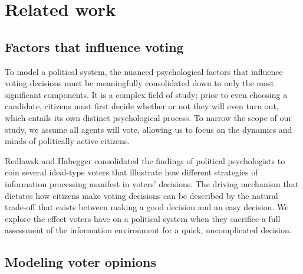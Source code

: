\section{Related work}
\label{sec:related}


%

\subsection{Factors that influence voting}

To model a political system, the nuanced psychological factors that influence
voting decisions must be meaningfully consolidated down to only the most
significant components. It is a complex field of study; prior to even choosing
a candidate, citizens must first decide whether or not they will even turn out,
which entails its own distinct psychological process. To narrow the scope of
our study, we assume all agents will vote, allowing us to focus on the dynamics
and minds of politically active citizens.

Redlawsk and Habegger\cite{redlawsk_citizens_2020} consolidated the findings
of political psychologists to coin several ideal-type voters that illustrate
how different strategies of information processing manifest in voters'
decisions. The driving mechanism that dictates how citizens make voting
decisions can be described by the natural trade-off that exists between making
a good decision and an easy decision. We explore the effect voters have on a
political system when they sacrifice a full assessment of the information
environment for a quick, uncomplicated decision. 


\subsection{Modeling voter opinions}

